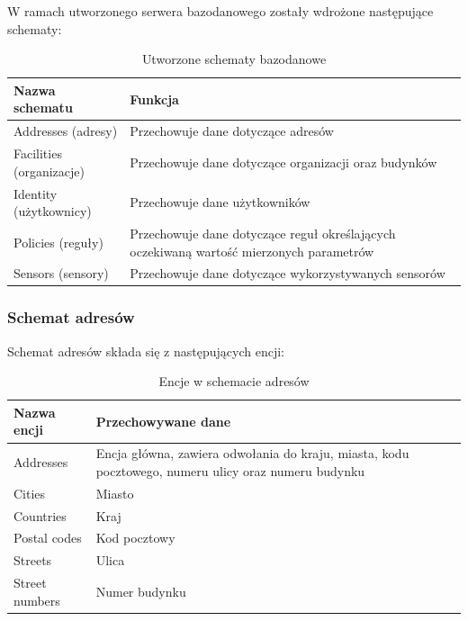 \documentclass[11pt, a4]{article} %
\begin{document}
W ramach utworzonego serwera bazodanowego zostały wdrożone następujące schematy:

\begin{table}[!ht]
    \caption{Utworzone schematy bazodanowe}
    \label{tab:schematy-bazodanowe}
    \begin{tabularx}{1\textwidth} { 
        | >{\raggedright\arraybackslash}X        
        | >{\raggedleft\arraybackslash}X | }
        \hline
       Nazwa schematu & Funkcja \\
       \hline
       Addresses (adresy) & 
       Przechowuje dane dotyczące adresów \\
       \hline
       Facilities (organizacje) &
       Przechowuje dane dotyczące organizacji oraz budynków \\
       \hline
       Identity (użytkownicy) &
       Przechowuje dane użytkowników \\
       \hline
       Policies (reguły) &
       Przechowuje dane dotyczące reguł określających oczekiwaną wartość mierzonych 
       parametrów \\
       \hline
       Sensors (sensory) & 
       Przechowuje dane dotyczące wykorzystywanych sensorów \\
       \hline
    \end{tabularx}
\end{table}

\subsubsection{Schemat adresów}

Schemat adresów składa się z następujących encji:

\begin{table}[!ht]
    \caption{Encje w schemacie adresów}
    \label{tab:encje-adresow}
    \begin{tabularx}{1\textwidth} { 
        | >{\raggedright\arraybackslash}X        
        | >{\raggedleft\arraybackslash}X | }
        \hline
       Nazwa encji & Przechowywane dane \\
       \hline
       Addresses & 
       Encja główna, zawiera odwołania do kraju, miasta, kodu pocztowego, numeru ulicy 
       oraz numeru budynku \\
       \hline
       Cities & Miasto \\
       \hline
       Countries & Kraj \\
       \hline
       Postal codes & Kod pocztowy \\
       \hline
       Streets & Ulica \\
       \hline
       Street numbers & Numer budynku \\
       \hline
    \end{tabularx}
\end{table}
\end{document}
